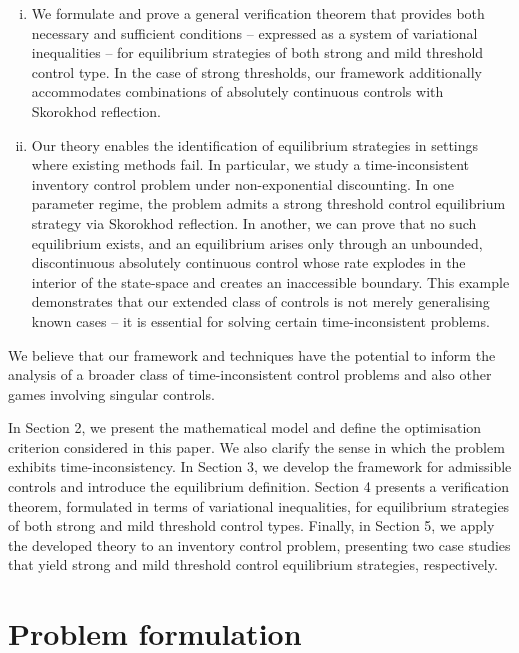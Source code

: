 \documentclass[11pt]{article} %
\numberwithin{komcounter}{section}
\begin{document}
\begin{enumerate}[(i)]
 
\vspace{-2mm}
\item We formulate and prove a general verification theorem that provides both necessary and sufficient conditions -- expressed as a system of variational inequalities -- for equilibrium strategies of both strong and mild threshold control type. 
In the case of strong thresholds, our framework additionally accommodates combinations of absolutely continuous controls with Skorokhod reflection.

 

\vspace{-2mm}
\item Our theory enables the identification of equilibrium strategies in settings where existing methods fail. 
In particular, we study a time-inconsistent inventory control problem under non-exponential discounting. 
In one parameter regime, the problem admits a strong threshold control equilibrium strategy via Skorokhod reflection. 
In another, we can prove that no such equilibrium exists, and an equilibrium arises only through an unbounded, discontinuous absolutely continuous control whose rate explodes in the interior of the state-space and creates an inaccessible boundary. 
This example demonstrates that our extended class of controls is not merely generalising known cases -- it is essential for solving certain time-inconsistent problems.

 
\end{enumerate}
\vspace{-1mm}
We believe that our framework and techniques have the potential to inform the analysis of a broader class of time-inconsistent control problems and also other games involving singular controls.
 

In Section 2, we present the mathematical model and define the optimisation criterion considered in this paper. 
We also clarify the sense in which the problem exhibits time-inconsistency. 
In Section 3, we develop the framework for admissible controls and introduce the equilibrium definition. 
Section 4 presents a verification theorem, formulated in terms of variational inequalities, for equilibrium strategies of both strong and mild threshold control types. 
Finally, in Section 5, we apply the developed theory to an inventory control problem, presenting two case studies that yield strong and mild threshold control equilibrium strategies, respectively.

 


\section{Problem formulation} 
\label{sec:model}
\end{document}
